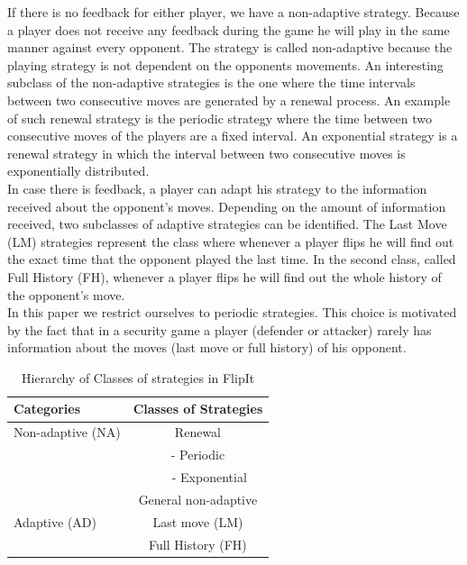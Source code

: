 If there is no feedback for either player, we have a non-adaptive strategy. Because a player does not receive any feedback during the game he will play in the same manner against every opponent. The strategy is called non-adaptive because the playing strategy is not dependent on the opponents movements. An interesting subclass of the non-adaptive strategies is the one where the time intervals between two consecutive moves are generated by a renewal process. An example of such renewal strategy is the periodic strategy where the time between two consecutive moves of the players are a fixed interval. An exponential strategy is a renewal strategy in which the interval between two consecutive moves is exponentially distributed. \\

In case there is feedback, a player can adapt his strategy to the information received about the opponent's moves. Depending on the amount of information received, two subclasses of adaptive strategies can be identified. The Last Move (LM) strategies represent the class where whenever a player flips he will find out the exact time that the opponent played the last time. In the second class, called Full History (FH), whenever a player flips he will find out the whole history of the opponent's move. \\

In this paper we restrict ourselves to periodic strategies. This choice is motivated by the fact that in a security game a player (defender or attacker) rarely has information about the moves (last move or full history) of his opponent.  \\


 \begin{table}
 \centering
 \begin{tabular}{ l | c  }
  \textbf{Categories} & \textbf{Classes of Strategies} \\
  \hline Non-adaptive (NA) & Renewal \\
  & - Periodic \\
  & ~~~ - Exponential \\
  & General non-adaptive \\
  \hline Adaptive (AD) & Last move (LM) \\
  & Full History (FH) \\  
\end{tabular}
 \caption{Hierarchy of Classes of strategies in FlipIt}
 \label{table:Strategies}
 \end{table}

